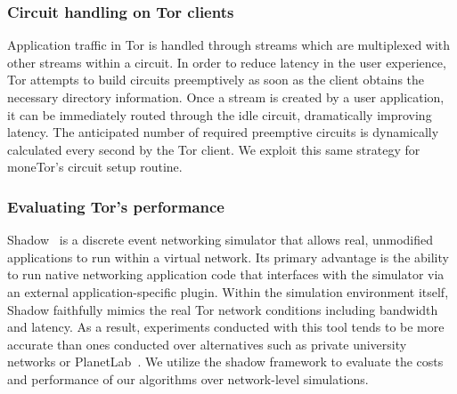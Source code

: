 \subsubsection{Circuit handling on Tor clients}
%

Application traffic in Tor is handled through streams
which are multiplexed with other streams within a circuit. In order to reduce
latency in the user experience, Tor attempts to build circuits preemptively as
soon as the client obtains the necessary directory information. Once a stream is
created by a user application, it can be immediately routed through the idle
circuit, dramatically improving latency. The anticipated number of required
preemptive circuits is dynamically calculated every second by the Tor client. We
exploit this same strategy for moneTor's circuit setup routine.

\subsubsection{Evaluating Tor's performance}
Shadow~\cite{jansen2011shadow} is a discrete event networking simulator that
allows real, unmodified applications to run within a virtual network. Its
primary advantage is the ability to run native networking application code that
interfaces with the simulator via an external application-specific
plugin. Within the simulation environment itself, Shadow faithfully mimics the
real Tor network conditions including bandwidth and latency. As a result,
experiments conducted with this tool tends to be more accurate than ones
conducted over alternatives such as private university networks or
PlanetLab~\cite{chun2003planetlab}. We utilize the shadow framework to
evaluate the costs and performance of our algorithms over network-level
simulations.


